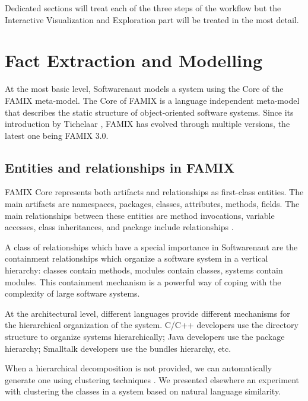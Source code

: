 \documentclass[preprint,12pt]{elsarticle}
\begin{document}
Dedicated sections will treat each of the three steps of the workflow but the Interactive Visualization and Exploration part will be treated in the most detail.




\newpage
\section {Fact Extraction and Modelling}
\label{sec:facts}


At the most basic level, Softwarenaut models a system using the Core of the FAMIX meta-model. The Core of FAMIX is a language independent meta-model that describes the static structure of object-oriented software systems. Since its introduction by Tichelaar \cite{tichelaar-thesis}, FAMIX has evolved through multiple versions, the latest one being FAMIX 3.0. 




\subsection {Entities and relationships in FAMIX}
FAMIX Core represents both artifacts and relationships as first-class entities. The main artifacts are namespaces, packages, classes, attributes, methods, fields. The main relationships between these entities are method invocations, variable accesses, class inheritances, and package include relationships \cite{tichelaar-thesis}.

A class of relationships which have a special importance in Softwarenaut are the containment relationships which organize a software system in a vertical hierarchy: classes contain methods, modules contain classes, systems contain modules. This containment mechanism is a powerful way of coping with the complexity of large software systems.

At the architectural level, different languages provide different mechanisms for the hierarchical organization of the system. C/C++ developers use the directory structure to organize systems hierarchically; Java developers use the package hierarchy; Smalltalk developers use the bundles hierarchy, etc. 

When a hierarchical decomposition is not provided, we can automatically generate one using clustering techniques \cite{koschke-thesis}. We presented elsewhere an experiment with clustering the classes in a system based on natural language similarity\cite{Lung05a}.
\end{document}
